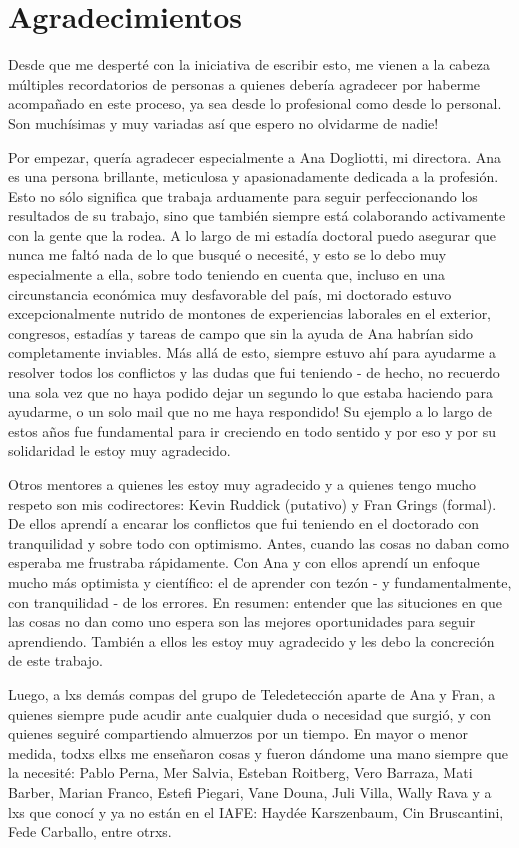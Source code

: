 \chapter*{Agradecimientos}

Desde que me desperté con la iniciativa de escribir esto, me vienen a la cabeza múltiples recordatorios de personas a quienes debería agradecer por haberme acompañado en este proceso, ya sea desde lo profesional como desde lo personal. Son muchísimas y muy variadas así que espero no olvidarme de nadie!

Por empezar, quería agradecer especialmente a Ana Dogliotti, mi directora. Ana es una persona brillante, meticulosa y apasionadamente dedicada a la profesión. Esto no sólo significa que trabaja arduamente para seguir perfeccionando los resultados de su trabajo, sino que también siempre está colaborando activamente con la gente que la rodea. A lo largo de mi estadía doctoral puedo asegurar que nunca me faltó nada de lo que busqué o necesité, y esto se lo debo muy especialmente a ella, sobre todo teniendo en cuenta que, incluso en una circunstancia económica muy desfavorable del país, mi doctorado estuvo excepcionalmente nutrido de montones de experiencias laborales en el exterior, congresos, estadías y tareas de campo que sin la ayuda de Ana habrían sido completamente inviables. Más allá de esto, siempre estuvo ahí para ayudarme a resolver todos los conflictos y las dudas que fui teniendo - de hecho, no recuerdo una sola vez que no haya podido dejar un segundo lo que estaba haciendo para ayudarme, o un solo mail que no me haya respondido! Su ejemplo a lo largo de estos años fue fundamental para ir creciendo en todo sentido y por eso y por su solidaridad le estoy muy agradecido.

Otros mentores a quienes les estoy muy agradecido y a quienes tengo mucho respeto son mis codirectores: Kevin Ruddick (putativo) y Fran Grings (formal). De ellos aprendí a encarar los conflictos que fui teniendo en el doctorado con tranquilidad y sobre todo con optimismo. Antes, cuando las cosas no daban como esperaba me frustraba rápidamente. Con Ana y con ellos aprendí un enfoque mucho más optimista y científico: el de aprender con tezón - y fundamentalmente, con tranquilidad - de los errores. En resumen: entender que las situciones en que las cosas no dan como uno espera son las mejores oportunidades para seguir aprendiendo. También a ellos les estoy muy agradecido y les debo la concreción de este trabajo.

Luego, a lxs demás compas del grupo de Teledetección aparte de Ana y Fran, a quienes siempre pude acudir ante cualquier duda o necesidad que surgió, y con quienes seguiré compartiendo almuerzos por un tiempo. En mayor o menor medida, todxs ellxs me enseñaron cosas y fueron dándome una mano siempre que la necesité: Pablo Perna, Mer Salvia, Esteban Roitberg, Vero Barraza, Mati Barber, Marian Franco, Estefi Piegari, Vane Douna, Juli Villa, Wally Rava y a lxs que conocí y ya no están en el IAFE: Haydée Karszenbaum, Cin Bruscantini, Fede Carballo, entre otrxs.

